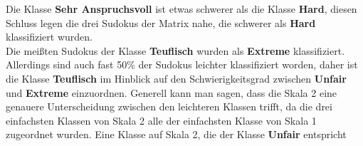 Die Klasse \textbf{Sehr Anspruchsvoll} ist etwas schwerer als die Klasse \textbf{Hard}, diesen Schluss legen die drei Sudokus der Matrix nahe, die schwerer als \textbf{Hard} klassifiziert wurden.\\
Die meißten Sudokus der Klasse \textbf{Teuflisch} wurden als \textbf{Extreme} klassifiziert. Allerdings sind auch fast 50\% der Sudokus leichter klassifiziert worden, daher ist die Klasse \textbf{Teuflisch} im Hinblick auf den Schwierigkeitsgrad zwischen \textbf{Unfair} und \textbf{Extreme} einzuordnen. Generell kann man sagen, dass die Skala 2 eine genauere Unterscheidung zwischen den leichteren Klassen trifft, da die drei einfachsten Klassen von Skala 2 alle der einfachsten Klasse von Skala 1 zugeordnet wurden. Eine Klasse auf Skala 2, die der Klasse \textbf{Unfair} entspricht